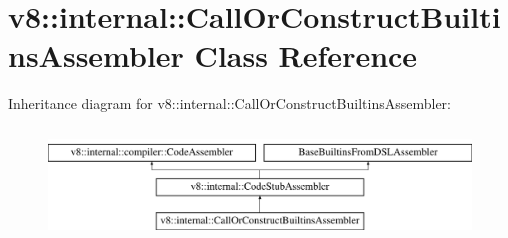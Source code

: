 \hypertarget{classv8_1_1internal_1_1CallOrConstructBuiltinsAssembler}{}\section{v8\+:\+:internal\+:\+:Call\+Or\+Construct\+Builtins\+Assembler Class Reference}
\label{classv8_1_1internal_1_1CallOrConstructBuiltinsAssembler}
Inheritance diagram for v8\+:\+:internal\+:\+:Call\+Or\+Construct\+Builtins\+Assembler\+:\begin{figure}[H]
\begin{center}
\leavevmode
\includegraphics[height=3.000000cm]{classv8_1_1internal_1_1CallOrConstructBuiltinsAssembler}
\end{center}
\end{figure}
